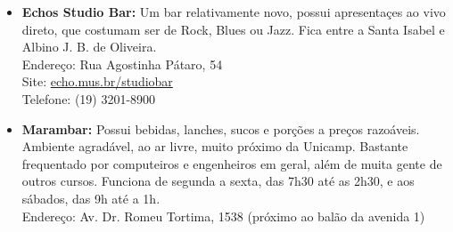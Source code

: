 \begin{itemize}
    \item   \textbf{Echos Studio Bar:} Um bar relativamente novo, possui
        apresentaçes ao vivo direto, que costumam ser de Rock, Blues ou Jazz.
        Fica entre a Santa Isabel e Albino J. B. de Oliveira.
        \\Endereço: Rua Agostinha Pátaro, 54
        \\Site: \url{echo.mus.br/studiobar}
        \\Telefone: (19) 3201-8900

    \item   \textbf{Marambar:} Possui bebidas, lanches, sucos e porções a preços
        razoáveis. Ambiente agradável, ao ar livre, muito próximo da Unicamp.
        Bastante frequentado por computeiros e engenheiros em geral, além de
        muita gente de outros cursos. Funciona de segunda a sexta, das 7h30 até
        as 2h30, e aos sábados, das 9h até a 1h.
        \\Endereço: Av. Dr. Romeu Tortima, 1538 (próximo ao balão da avenida 1)
        
\end{itemize}
